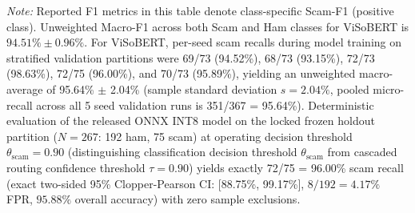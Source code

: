 \documentclass[journal]{IEEEtran}
\begin{document}
\begin{table}[t]
\centering
\caption{Multi-Seed Validation Performance across 5 Independent Training Runs ($K=5$) and Released INT8 Model Benchmark on Locked Frozen Holdout ($N=267$)}
\label{tab:benchmark_summary}
\vspace{1ex}
\parbox{\textwidth}{\footnotesize \textit{Note:} Reported F1 metrics in this table denote class-specific Scam-F1 (positive class). Unweighted Macro-F1 across both Scam and Ham classes for ViSoBERT is $94.51\% \pm 0.96\%$. For ViSoBERT, per-seed scam recalls during model training on stratified validation partitions were 69/73 (94.52\%), 68/73 (93.15\%), 72/73 (98.63\%), 72/75 (96.00\%), and 70/73 (95.89\%), yielding an unweighted macro-average of 95.64\% $\pm$ 2.04\% (sample standard deviation $s=2.04\%$, pooled micro-recall across all 5 seed validation runs is 351/367 = 95.64\%). Deterministic evaluation of the released ONNX INT8 model on the locked frozen holdout partition ($N=267$: 192 ham, 75 scam) at operating decision threshold $\theta_{\text{scam}}=0.90$ (distinguishing classification decision threshold $\theta_{\text{scam}}$ from cascaded routing confidence threshold $\tau = 0.90$) yields exactly 72/75 = 96.00\% scam recall (exact two-sided 95\% Clopper-Pearson CI: [88.75\%, 99.17\%], $8/192 = 4.17\%$ FPR, $95.88\%$ overall accuracy) with zero sample exclusions.}
\end{table}
\end{document}
